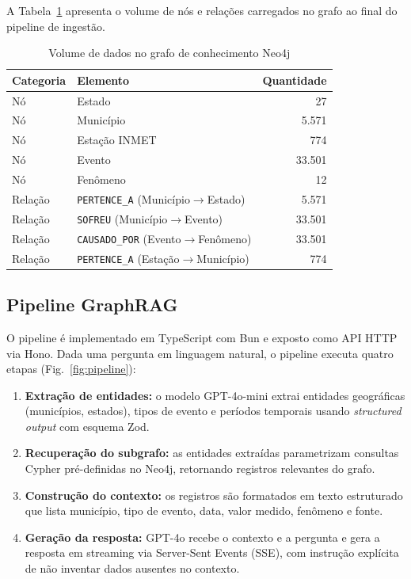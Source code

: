 \documentclass[conference]{IEEEtran}
\begin{document}
A Tabela~\ref{tab:grafo_stats} apresenta o volume de nós e
relações carregados no grafo ao final do pipeline de ingestão.

\begin{table}[htbp]
\caption{Volume de dados no grafo de conhecimento Neo4j}
\label{tab:grafo_stats}
\begin{center}
\begin{tabular}{llr}
\toprule
\textbf{Categoria} & \textbf{Elemento} & \textbf{Quantidade} \\
\midrule
Nó & Estado         &      27 \\
Nó & Município      &  5.571  \\
Nó & Estação INMET  &    774  \\
Nó & Evento         & 33.501  \\
Nó & Fenômeno       &      12 \\
\addlinespace
Relação & \texttt{PERTENCE\_A} (Município$\to$Estado) & 5.571 \\
Relação & \texttt{SOFREU} (Município$\to$Evento)      & 33.501 \\
Relação & \texttt{CAUSADO\_POR} (Evento$\to$Fenômeno) & 33.501 \\
Relação & \texttt{PERTENCE\_A} (Estação$\to$Município)&    774 \\
\bottomrule
\end{tabular}
\end{center}
\end{table}

\subsection{Pipeline GraphRAG}

O pipeline é implementado em TypeScript com Bun e exposto como
API HTTP via Hono. Dada uma pergunta em linguagem natural, o
pipeline executa quatro etapas (Fig.~\ref{fig:pipeline}):

\begin{enumerate}
  \item \textbf{Extração de entidades:} o modelo GPT-4o-mini
        extrai entidades geográficas (municípios, estados),
        tipos de evento e períodos temporais usando
        \textit{structured output} com esquema Zod.
  \item \textbf{Recuperação do subgrafo:} as entidades extraídas
        parametrizam consultas Cypher pré-definidas no Neo4j,
        retornando registros relevantes do grafo.
  \item \textbf{Construção do contexto:} os registros são
        formatados em texto estruturado que lista município, tipo
        de evento, data, valor medido, fenômeno e fonte.
  \item \textbf{Geração da resposta:} GPT-4o recebe o contexto
        e a pergunta e gera a resposta em streaming via
        Server-Sent Events (SSE), com instrução explícita de não
        inventar dados ausentes no contexto.
\end{enumerate}
\end{document}
